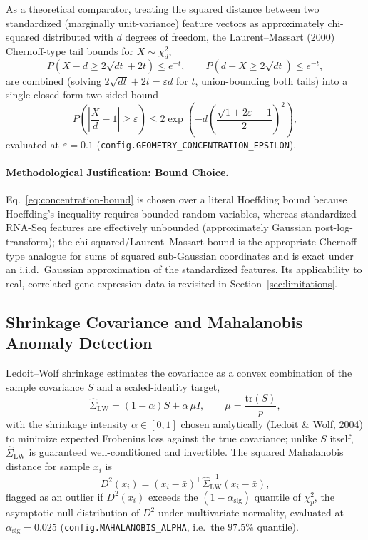 \documentclass[11pt]{article}
\begin{document}
As a theoretical comparator, treating the squared distance between two
standardized (marginally unit-variance) feature vectors as approximately
chi-squared distributed with $d$ degrees of freedom, the Laurent--Massart
(2000) Chernoff-type tail bounds for $X \sim \chi^2_d$,
\begin{equation}
P(X - d \geq 2\sqrt{dt} + 2t) \leq e^{-t}, \qquad P(d - X \geq 2\sqrt{dt}) \leq e^{-t},
\label{eq:laurent-massart}
\end{equation}
are combined (solving $2\sqrt{dt}+2t = \varepsilon d$ for $t$, union-bounding
both tails) into a single closed-form two-sided bound
\begin{equation}
P\left(\left|\frac{X}{d} - 1\right| \geq \varepsilon\right) \leq 2\exp\!\left(-d \left(\frac{\sqrt{1+2\varepsilon}-1}{2}\right)^2\right),
\label{eq:concentration-bound}
\end{equation}
evaluated at $\varepsilon = 0.1$ (\texttt{config.GEOMETRY\_CONCENTRATION\_EPSILON}).

\paragraph{Methodological Justification: Bound Choice.} Eq.~\ref{eq:concentration-bound}
is chosen over a literal Hoeffding bound because Hoeffding's inequality
requires bounded random variables, whereas standardized RNA-Seq features
are effectively unbounded (approximately Gaussian post-log-transform); the
chi-squared/Laurent--Massart bound is the appropriate Chernoff-type
analogue for sums of squared sub-Gaussian coordinates and is exact under an
i.i.d.\ Gaussian approximation of the standardized features. Its
applicability to real, correlated gene-expression data is revisited in
Section~\ref{sec:limitations}.

\subsection{Shrinkage Covariance and Mahalanobis Anomaly Detection}

Ledoit--Wolf shrinkage estimates the covariance as a convex combination of
the sample covariance $S$ and a scaled-identity target,
\begin{equation}
\hat{\Sigma}_{\text{LW}} = (1-\alpha) S + \alpha \, \mu I, \qquad \mu = \frac{\mathrm{tr}(S)}{p},
\label{eq:ledoit-wolf}
\end{equation}
with the shrinkage intensity $\alpha \in [0,1]$ chosen analytically
(Ledoit \& Wolf, 2004) to minimize expected Frobenius loss against the true
covariance; unlike $S$ itself, $\hat\Sigma_{\text{LW}}$ is guaranteed
well-conditioned and invertible. The squared Mahalanobis distance for
sample $x_i$ is
\begin{equation}
D^2(x_i) = (x_i - \bar{x})^\top \hat{\Sigma}_{\text{LW}}^{-1} (x_i - \bar{x}),
\label{eq:mahalanobis}
\end{equation}
flagged as an outlier if $D^2(x_i)$ exceeds the $(1-\alpha_{\text{sig}})$
quantile of $\chi^2_p$, the asymptotic null distribution of $D^2$ under
multivariate normality, evaluated at $\alpha_{\text{sig}} = 0.025$
(\texttt{config.MAHALANOBIS\_ALPHA}, i.e.\ the $97.5\%$ quantile).
\end{document}
